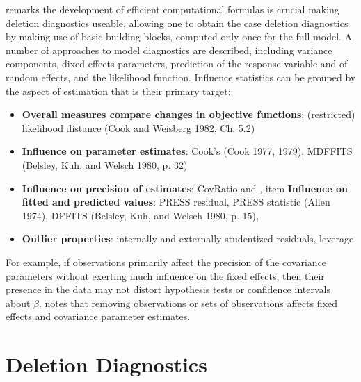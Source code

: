 \documentclass[12pt, a4paper]{report}
\theoremstyle{definition}
\theoremstyle{remark}
\begin{document}
\citet{Zewotir} remarks the development of efficient computational formulas is crucial making deletion diagnostics useable, allowing one to obtain the  case deletion diagnostics by making use of basic building blocks, computed only once for the full model. A number of approaches to model diagnostics are described, including variance components, dixed effects parameters, prediction of the response variable and of random effects, and the likelihood function. Influence statistics can be grouped by the aspect of estimation that is their primary target:
\begin{itemize}
	\item \textbf{Overall measures compare changes in objective functions}: (restricted) likelihood distance (Cook and Weisberg 1982, Ch. 5.2)
	\item \textbf{Influence on parameter estimates}: Cook's  (Cook 1977, 1979), MDFFITS (Belsley, Kuh, and Welsch 1980, p. 32)
	\item \textbf{Influence on precision of estimates}: CovRatio and \texttt{},       item \textbf{Influence on fitted and predicted values}: PRESS residual, PRESS statistic (Allen 1974), DFFITS (Belsley, Kuh, and Welsch 1980, p. 15),
	\item \textbf{Outlier properties}: internally and externally studentized residuals, leverage
\end{itemize}




For example, if observations primarily affect the precision of the covariance parameters without exerting much influence on the fixed effects, then their presence in the data may not distort hypothesis
tests or confidence intervals about $\beta$. 
\citet{schabenberger} notes that removing observations or sets of observations affects fixed effects and covariance parameter estimates.





\section{Deletion Diagnostics}

\end{document}
